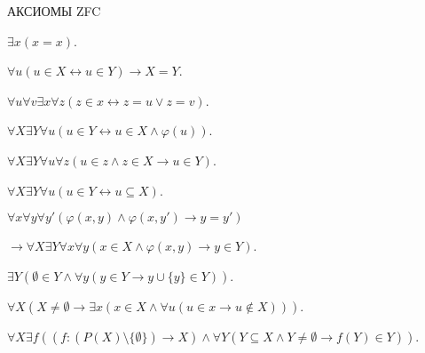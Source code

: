 \documentclass[a4paper,11pt]{article}
\begin{document}
АКСИОМЫ ZFC
\medskip

\item $\exists x(x=x)$.

\item $\forall u(u\in X\leftrightarrow u\in Y)\to X=Y$.

\item $\forall u\forall v\exists x\forall z(z\in x\leftrightarrow z=u\lor z=v)$.

\item $\forall X\exists Y\forall u(u\in Y\leftrightarrow u\in X\land\varphi(u))$.

\item $\forall X\exists Y\forall u\forall z(u\in z\land z\in X\to u\in Y)$.

\item $\forall X\exists Y\forall u(u\in Y\leftrightarrow u\subseteq X)$.
\medskip

\item $\forall x\forall y\forall y'(\varphi(x,y)\land\varphi(x,y')\to y=y')$

$\to\forall X\exists Y\forall x\forall y(x\in X\land\varphi(x,y)\to y\in Y)$.
\medskip

\item $\exists Y(\emptyset\in Y\land\forall y(y\in Y\to y\cup\{y\}\in Y))$.
\medskip

\item $\forall X(X\not=\emptyset\to\exists x(x\in X\land\forall u(u\in x\to u\not\in X)))$.
\medskip

\item $\forall X\exists f((f:(P(X)\setminus\{\emptyset\})\to X)\land\forall Y(Y\subseteq X\land Y\not=\emptyset\to f(Y)\in Y))$.
\end{document}

